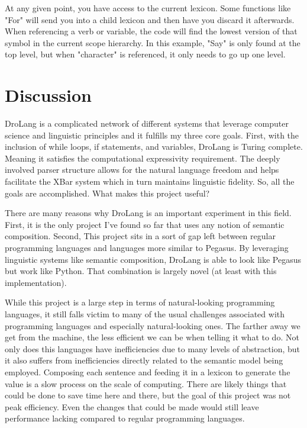 \documentclass[titlepage]{article}
\newcommand{\langName}{DroLang}
\begin{document}
At any given point, you have access to the current lexicon. Some functions like "For" will send you into a child lexicon and then have you discard it afterwards. When referencing a verb or variable, the code will find the lowest version of that symbol in the current scope hierarchy. In this example, "Say" is only found at the top level, but when "character" is referenced, it only needs to go up one level.

\section*{Discussion}
\langName{} is a complicated network of different systems that leverage computer science and linguistic principles and it fulfills my three core goals. First, with the inclusion of while loops, if statements, and variables, \langName{} is Turing complete. Meaning it satisfies the computational expressivity requirement. The deeply involved parser structure allows for the natural language freedom and helps facilitate the XBar system which in turn maintains linguistic fidelity. So, all the goals are accomplished. What makes this project useful?

There are many reasons why \langName{} is an important experiment in this field. First, it is the only project I've found so far that uses any notion of semantic composition. Second, This project sits in a sort of gap left between regular programming languages and languages more similar to Pegasus. By leveraging linguistic systems like semantic composition, \langName{} is able to look like Pegasus but work like Python. That combination is largely novel (at least with this implementation).

While this project is a large step in terms of natural-looking programming languages, it still falls victim to many of the usual challenges associated with programming languages and especially natural-looking ones. The farther away we get from the machine, the less efficient we can be when telling it what to do. Not only does this languages have inefficiencies due to many levels of abstraction, but it also suffers from inefficiencies directly related to the semantic model being employed. Composing each sentence and feeding it in a lexicon to generate the value is a slow process on the scale of computing. There are likely things that could be done to save time here and there, but the goal of this project was not peak efficiency. Even the changes that could be made would still leave performance lacking compared to regular programming languages.
\end{document}
